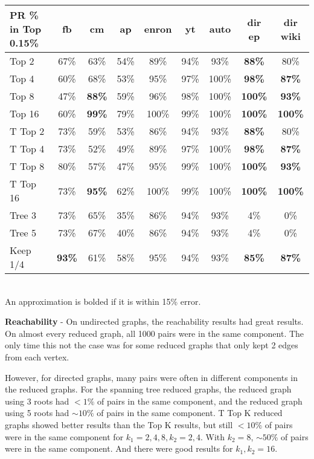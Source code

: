 \documentclass[11pt]{article}
\begin{document}
\begin{tabular}{| l | c | c | c | c | c | c | c | c |}
	\hline
	PR \% in Top 0.15\% & fb & cm & ap & \textbf{enron} & \textbf{yt} & \textbf{auto} & dir ep & dir wiki \\ \hline
	Top 2 & 67\% & 63\% & 54\% & 89\% & 94\% & 93\% & \textbf{88\%} & 80\% \\ \hline
	Top 4 & 60\% & 68\% & 53\% & 95\% & 97\% & 100\% & \textbf{98\%} & \textbf{87\%} \\ \hline
	Top 8 & 47\% & \textbf{88\%} & 59\% & 96\% & 98\% & 100\% & \textbf{100\%} & \textbf{93\%} \\ \hline
	Top 16 & 60\% & \textbf{99\%} & 79\% & 100\% & 99\% & 100\% & \textbf{100\%} & \textbf{100\%} \\ \hline
	T Top 2 & 73\% & 59\% & 53\% & 86\% & 94\% & 93\% & \textbf{88\%} & 80\% \\ \hline
	T Top 4 & 73\% & 52\% & 49\% & 89\% & 97\% & 100\% & \textbf{98\%} & \textbf{87\%} \\ \hline
	T Top 8 & 80\% & 57\% & 47\% & 95\% & 99\% & 100\% & \textbf{100\%} & \textbf{93\%} \\ \hline
	T Top 16 & 73\% & \textbf{95\%} & 62\% & 100\% & 99\% & 100\% & \textbf{100\%} & \textbf{100\%} \\ \hline
	Tree 3 & 73\% & 65\% & 35\% & 86\% & 94\% & 93\% & 4\% & 0\% \\ \hline
	Tree 5 & 73\% & 67\% & 40\% & 86\% & 94\% & 93\% & 4\% & 0\% \\ \hline
	Keep 1/4 & \textbf{93\%} & 61\% & 58\% & 95\% & 94\% & 93\% & \textbf{85\%} & \textbf{87\%} \\ \hline
	
\end{tabular}\\
An approximation is bolded if it is within 15\% error.

\textbf{Reachability} - On undirected graphs, the reachability results had great results.  On almost every reduced graph, all 1000 pairs were in the same component.  The only time this not the case was for some reduced graphs that only kept 2 edges from each vertex.

However, for directed graphs, many pairs were often in different components in the reduced graphs.  For the spanning tree reduced graphs, the reduced graph using 3 roots had $< 1\%$ of pairs in the same component, and the reduced graph using 5 roots had $\sim 10\%$ of pairs in the same component.  T Top K reduced graphs showed better results than the Top K results, but still $<10\%$ of pairs were in the same component for $k_1 = 2, 4, 8, k_2 = 2, 4$.  With $k_2 = 8$, $\sim50\%$ of pairs were in the same component.  And there were good results for $k_1, k_2 = 16$.
\end{document}
